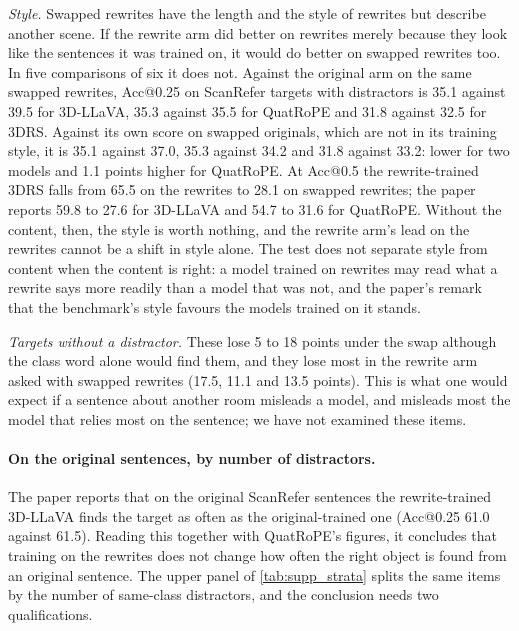 \emph{Style.}
Swapped rewrites have the length and the style of rewrites but describe another scene.
If the rewrite arm did better on rewrites merely because they look like the sentences it was trained on, it would do better on swapped rewrites too.
In five comparisons of six it does not.
Against the original arm on the same swapped rewrites, Acc@0.25 on ScanRefer targets with distractors is 35.1 against 39.5 for 3D-LLaVA, 35.3 against 35.5 for QuatRoPE and 31.8 against 32.5 for 3DRS.
Against its own score on swapped originals, which are not in its training style, it is 35.1 against 37.0, 35.3 against 34.2 and 31.8 against 33.2: lower for two models and 1.1 points higher for QuatRoPE.
At Acc@0.5 the rewrite-trained 3DRS falls from 65.5 on the rewrites to 28.1 on swapped rewrites; the paper reports 59.8 to 27.6 for 3D-LLaVA and 54.7 to 31.6 for QuatRoPE.
Without the content, then, the style is worth nothing, and the rewrite arm's lead on the rewrites cannot be a shift in style alone.
The test does not separate style from content when the content is right: a model trained on rewrites may read what a rewrite says more readily than a model that was not, and the paper's remark that the benchmark's style favours the models trained on it stands.

\emph{Targets without a distractor.}
These lose 5 to 18 points under the swap although the class word alone would find them, and they lose most in the rewrite arm asked with swapped rewrites (17.5, 11.1 and 13.5 points).
This is what one would expect if a sentence about another room misleads a model, and misleads most the model that relies most on the sentence; we have not examined these items.


\paragraph{On the original sentences, by number of distractors.}
The paper reports that on the original ScanRefer sentences the rewrite-trained 3D-LLaVA finds the target as often as the original-trained one (Acc@0.25 61.0 against 61.5).
Reading this together with QuatRoPE's figures, it concludes that training on the rewrites does not change how often the right object is found from an original sentence.
The upper panel of \cref{tab:supp_strata} splits the same items by the number of same-class distractors, and the conclusion needs two qualifications.

